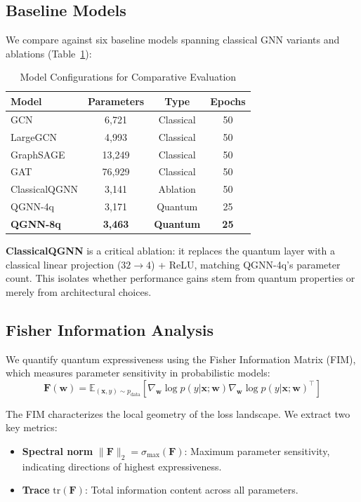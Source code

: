 \documentclass[conference]{IEEEtran}
\begin{document}
\subsection{Baseline Models}

We compare against six baseline models spanning classical GNN variants and ablations (Table~\ref{tab:models}):

\begin{table}[t]
\centering
\caption{Model Configurations for Comparative Evaluation}
\label{tab:models}
\begin{tabular}{@{}lccc@{}}
\toprule
\textbf{Model} & \textbf{Parameters} & \textbf{Type} & \textbf{Epochs} \\
\midrule
GCN~\cite{b4} & 6,721 & Classical & 50 \\
LargeGCN & 4,993 & Classical & 50 \\
GraphSAGE~\cite{b1} & 13,249 & Classical & 50 \\
GAT~\cite{b2} & 76,929 & Classical & 50 \\
\midrule
ClassicalQGNN & 3,141 & Ablation & 50 \\
QGNN-4q & 3,171 & Quantum & 25 \\
\textbf{QGNN-8q} & \textbf{3,463} & \textbf{Quantum} & \textbf{25} \\
\bottomrule
\end{tabular}
\end{table}

\noindent\textbf{ClassicalQGNN} is a critical ablation: it replaces the quantum layer with a classical linear projection ($32 \rightarrow 4$) + ReLU, matching QGNN-4q's parameter count. This isolates whether performance gains stem from quantum properties or merely from architectural choices.

\subsection{Fisher Information Analysis}
\label{sec:fim_method}

We quantify quantum expressiveness using the Fisher Information Matrix (FIM), which measures parameter sensitivity in probabilistic models:
\begin{equation}
\mathbf{F}(\mathbf{w}) = \mathbb{E}_{(\mathbf{x},y) \sim p_{\text{data}}} \left[ \nabla_{\mathbf{w}} \log p(y|\mathbf{x};\mathbf{w}) \nabla_{\mathbf{w}} \log p(y|\mathbf{x};\mathbf{w})^\top \right]
\label{eq:fim}
\end{equation}

The FIM characterizes the local geometry of the loss landscape. We extract two key metrics:
\begin{itemize}
\item \textbf{Spectral norm} $\|\mathbf{F}\|_2 = \sigma_{\max}(\mathbf{F})$: Maximum parameter sensitivity, indicating directions of highest expressiveness.
\item \textbf{Trace} $\text{tr}(\mathbf{F})$: Total information content across all parameters.
\end{itemize}
\end{document}

